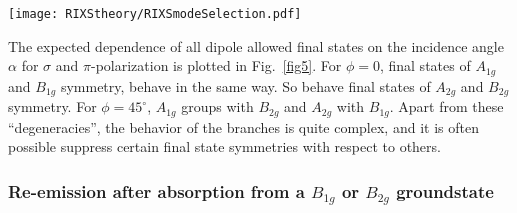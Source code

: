 \documentclass[twocolumn,prb,twocolumn,amsmath,superscriptaddress,nofootinbib,amssymb]{revtex4-1}
\begin{document}
\begin{widetext}
\begin{figure*}[htbp]
\begin{center}
\texttt{[image: RIXStheory/RIXSmodeSelection.pdf]}
\caption{\label{fig5} Angular dependence of all dipole allowed final states from a $A_{1g}$ ground state in $\sigma$- and $\pi$-polarized configuration. The results are shown \textbf{(left)} for scattering angles $\tau=90^{\circ}$ and \textbf{(right)} $130^{\circ}$ as used throughout the scope of this thesis. }
\end{center}
\end{figure*}


The expected dependence of all dipole allowed final states on the incidence angle $\alpha$ for $\sigma$ and $\pi$-polarization is plotted in Fig.~\ref{fig5}. For $\phi=0$, final states of $A_{1g}$ and $B_{1g}$ symmetry, behave in the same way. So behave final states of $A_{2g}$ and $B_{2g}$ symmetry. For $\phi=45^{\circ}$, $A_{1g}$ groups with $B_{2g}$ and $A_{2g}$ with $B_{1g}$. Apart from these ``degeneracies'', the behavior of the branches is quite complex, and it is often possible suppress certain final state symmetries with respect to others.


\subsubsection{Re-emission after absorption from a $B_{1g}$ or $B_{2g}$ groundstate}


\begin{table*}[htbp]
\end{table*}
\end{widetext}
\end{document}

